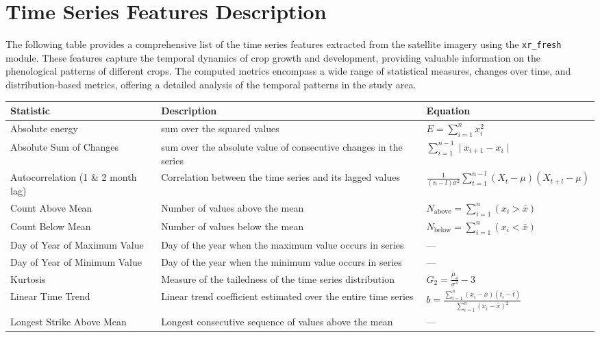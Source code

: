 \documentclass[journal]{IEEEtran}
\begin{document}
\section{Time Series Features Description}
The following table provides a comprehensive list of the time series features extracted from the satellite imagery using the \texttt{xr\_fresh} module. These features capture the temporal dynamics of crop growth and development, providing valuable information on the phenological patterns of different crops. The computed metrics encompass a wide range of statistical measures, changes over time, and distribution-based metrics, offering a detailed analysis of the temporal patterns in the study area.

\onecolumn
\renewcommand{\arraystretch}{1.5}  
 
\begin{longtable}{|p{4cm}|p{5cm}|p{6cm}|}
\hline
\textbf{Statistic} & \textbf{Description} & \textbf{Equation} \\
\hline
\endhead
Absolute energy &  sum over the squared values & $E = \sum_{i=1}^n x_i^2$ \\
Absolute Sum of Changes  & sum over the absolute value of consecutive changes in the series  & $ \sum_{i=1}^{n-1} \mid x_{i+1}- x_i \mid $ \\
Autocorrelation (1 \& 2 month lag) & Correlation between the time series and its lagged values & $\frac{1}{(n-l)\sigma^{2}} \sum_{t=1}^{n-l}(X_{t}-\mu )(X_{t+l}-\mu)$\\
Count Above Mean & Number of values above the mean & $N_{\text{above}} = \sum_{i=1}^n (x_i > \bar{x})$ \\
Count Below Mean & Number of values below the mean & $N_{\text{below}} = \sum_{i=1}^n (x_i < \bar{x})$ \\Day of Year of Maximum Value & Day of the year when the maximum value occurs in series & --- \\
Day of Year of Minimum Value & Day of the year when the minimum value occurs in series & --- \\
Kurtosis & Measure of the tailedness of the time series distribution & $G_2 = \frac{\mu_4}{\sigma^4} - 3$ \\
Linear Time Trend & Linear trend coefficient estimated over the entire time series & $b = \frac{\sum_{i=1}^n (x_i - \bar{x})(t_i - \bar{t})}{\sum_{i=1}^n (x_i - \bar{x})^2}$ \\
Longest Strike Above Mean & Longest consecutive sequence of values above the mean & --- \\

\end{longtable}
\end{document}
